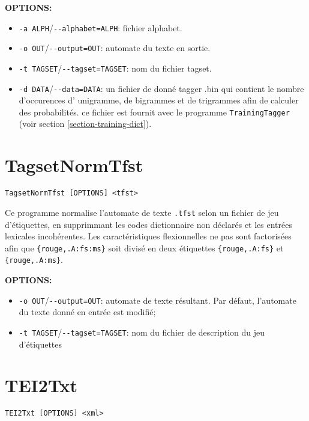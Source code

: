 \bigskip
\noindent \textbf{OPTIONS:}
\begin{itemize}
\item \verb+-a ALPH+/\verb+--alphabet=ALPH+: fichier alphabet.
\item \verb+-o OUT+/\verb+--output=OUT+: automate du texte en sortie.
  \item \verb+-t TAGSET+/\verb+--tagset=TAGSET+: nom du fichier tagset.
  \item \verb+-d DATA+/\verb+--data=DATA+: un fichier de donné tagger .bin  qui contient le nombre d'occurences d' 
  	  unigramme, de bigrammes et de  trigrammes afin de calculer des probabilités. ce fichier est fournit avec 
  	  le programme \verb+TrainingTagger+ (voir section \ref{section-training-dict}).
\end{itemize}





\section{TagsetNormTfst}
 \verb+TagsetNormTfst [OPTIONS] <tfst>+

\bigskip
\noindent Ce programme normalise l’automate de texte \verb+.tfst+ selon
un fichier de jeu d'étiquettes, en supprimmant les codes dictionnaire non déclarés
et les entrées lexicales incohérentes. Les caractéristiques flexionnelles ne pas sont factorisées
afin que \verb+{rouge,.A:fs:ms}+ soit divisé en deux étiquettes \verb+{rouge,.A:fs}+ 
et \verb+{rouge,.A:ms}+.

\bigskip
\noindent \textbf{OPTIONS:}
\begin{itemize}
\item \verb+-o OUT+/\verb+--output=OUT+: automate de texte résultant. Par défaut, l'automate du texte donné en entrée est modifié;
\item \verb+-t TAGSET+/\verb+--tagset=TAGSET+: nom du fichier de description du jeu d'étiquettes
\end{itemize}







\section{TEI2Txt} 
\verb+TEI2Txt [OPTIONS] <xml>+

